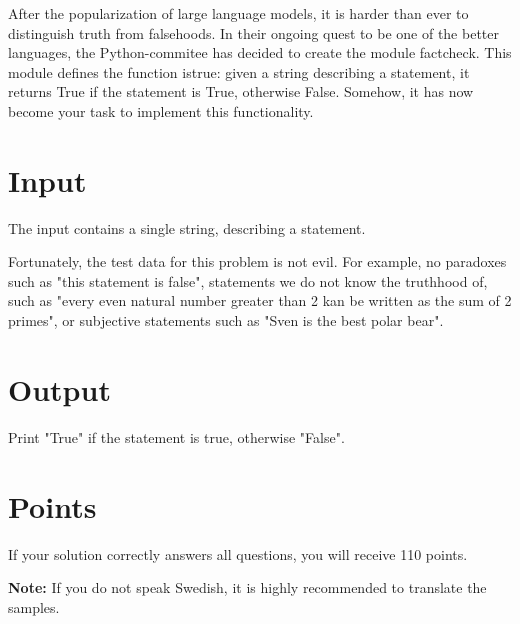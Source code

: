 \noindent

After the popularization of large language models, it is harder than ever to distinguish
truth from falsehoods. In their ongoing quest to be one of the better languages,
the Python-commitee has decided to create the module factcheck. This module defines
the function istrue: given a string describing a statement, it returns True if the
statement is True, otherwise False. Somehow, it has now become your task to implement
this functionality.

\section*{Input}
\noindent
The input contains a single string, describing a statement.

Fortunately, the test data for this problem is not evil. For example, no paradoxes such as
"this statement is false", statements we do not know the truthhood of, such as "every even
natural number greater than 2 kan be written as the sum of 2 primes", or subjective statements
such as "Sven is the best polar bear".

\section*{Output}
\noindent
Print "True" if the statement is true, otherwise "False".

\section*{Points}
If your solution correctly answers all questions, you will receive 110 points.

\textbf{Note:} If you do not speak Swedish, it is highly recommended to translate the samples.
